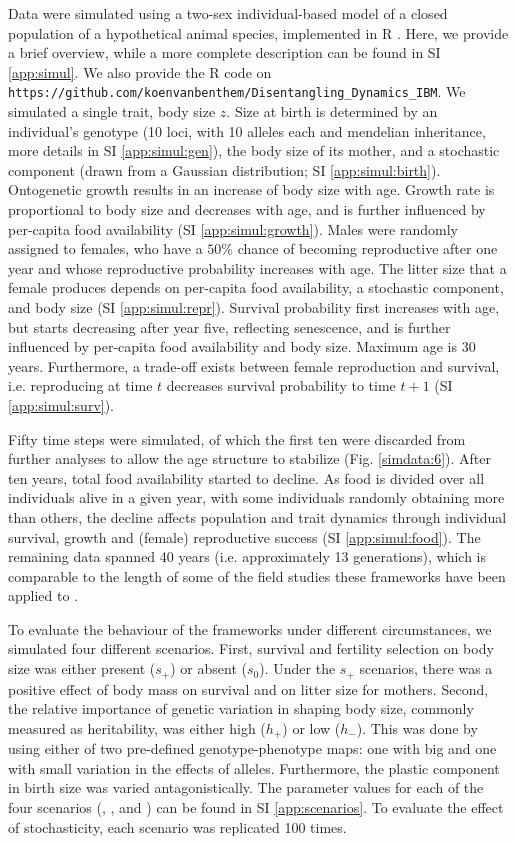 Data were simulated using a two-sex individual-based model of a closed population of a hypothetical animal species, implemented in R \parencite{R}. Here, we provide a brief overview, while a more complete description can be found in SI \ref{app:simul}. We also provide the R code on \newline \verb|https://github.com/koenvanbenthem/Disentangling_Dynamics_IBM|. We simulated a single trait, body size $z$. Size at birth is determined by an individual's genotype (10 loci, with 10 alleles each and mendelian inheritance, more details in SI \ref{app:simul:gen}), the body size of its mother, and a stochastic component (drawn from a Gaussian distribution; SI \ref{app:simul:birth}). Ontogenetic growth results in an increase of body size with age. Growth rate is proportional to body size and decreases with age, and is further influenced by per-capita food availability (SI \ref{app:simul:growth}). Males were randomly assigned to females, who have a $50\%$ chance of becoming reproductive after one year and whose reproductive probability increases with age. The litter size that a female produces depends on per-capita food availability, a stochastic component, and body size (SI \ref{app:simul:repr}). Survival probability first increases with age, but starts decreasing after year five, reflecting senescence, and is further influenced by per-capita food availability and body size. Maximum age is 30 years. Furthermore, a trade-off exists between female reproduction and survival, i.e. reproducing at time $t$ decreases survival probability to time $t+1$ (SI \ref{app:simul:surv}). 

Fifty time steps were simulated, of which the first ten were discarded from further analyses to allow the age structure to stabilize (Fig. \ref{simdata:6}). After ten years, total food availability started to decline. As food is divided over all individuals alive in a given year, with some individuals randomly obtaining more than others, the decline affects population and trait dynamics through individual survival, growth and (female) reproductive success (SI \ref{app:simul:food}). The remaining data spanned 40 years (i.e. approximately 13 generations), which is comparable to the length of some of the field studies these frameworks have been applied to \parencite{Clutton-brock2010}. 

To evaluate the behaviour of the frameworks under different circumstances, we simulated four different scenarios. First, survival and fertility selection on body size was either present ($s_+$) or absent ($s_0$). Under the $s_+$ scenarios, there was a positive effect of body mass on survival and on litter size for mothers. Second, the relative importance of genetic variation in shaping body size, commonly measured as heritability, was either high ($h_+$) or low ($h_-$). This was done by using either of two pre-defined genotype-phenotype maps: one with big and one with small variation in the effects of alleles. Furthermore, the plastic component in birth size was varied antagonistically. The parameter values for each of the four scenarios (\sh, \sH, \Sh and \SH) can be found in SI \ref{app:scenarios}. To evaluate the effect of stochasticity, each scenario was replicated 100 times.


